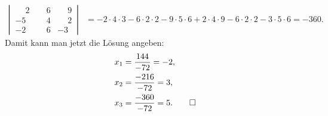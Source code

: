\begin{loesung}
\begin{align*}
\left|\,\begin{matrix}
\phantom{-}2&\phantom{-}6&\phantom{-}9\\
         - 5&\phantom{-}4&\phantom{-}2\\
         - 2&\phantom{-}6&         - 3
\end{matrix}\,\right|
&=
-2\cdot4\cdot 3-6\cdot2\cdot 2-9\cdot5\cdot 6+2\cdot4\cdot 9-6\cdot 2\cdot 2-3\cdot 5\cdot 6
=-360.
\end{align*}
Damit kann man jetzt die Lösung angeben:
\begin{align*}
x_1&=\frac{144}{-72}=-2,\\
x_2&=\frac{-216}{-72}=3,\\
x_3&=\frac{-360}{-72}=5.
\qedhere
\end{align*}
\end{loesung}
